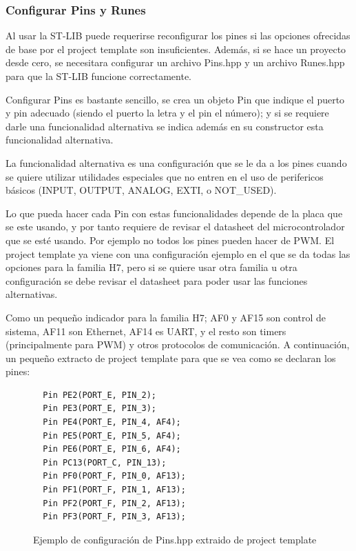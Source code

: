 \documentclass{report}
\begin{document}
\subsubsection{Configurar Pins y Runes}
Al usar la ST-LIB puede requerirse reconfigurar los pines si las opciones ofrecidas de base por el project template son insuficientes. Además, si se hace un proyecto desde cero, se necesitara configurar un archivo Pins.hpp y un archivo Runes.hpp para que la ST-LIB funcione correctamente. 
\par \vspace{0.3cm}
Configurar Pins es bastante sencillo, se crea un objeto Pin que indique el puerto y pin adecuado (siendo el puerto la letra y el pin el número); y si se requiere darle una funcionalidad alternativa se indica además en su constructor esta funcionalidad alternativa. 
\par
La funcionalidad alternativa es una configuración que se le da a los pines cuando se quiere utilizar utilidades especiales que no entren en el uso de perifericos básicos (INPUT, OUTPUT, ANALOG, EXTI, o NOT\_USED). 
\par
Lo que pueda hacer cada Pin con estas funcionalidades depende de la placa que se este usando, y por tanto requiere de revisar el datasheet del microcontrolador que se esté usando. Por ejemplo no todos los pines pueden hacer de PWM. El project template ya viene con una configuración ejemplo en el que se da todas las opciones para la familia H7, pero si se quiere usar otra familia u otra configuración se debe revisar el datasheet para poder usar las funciones alternativas. \par \vspace{0.3cm}
Como un pequeño indicador para la familia H7; AF0 y AF15 son control de sistema, AF11 son Ethernet, AF14 es UART, y el resto son timers (principalmente para PWM) y otros protocolos de comunicación. A continuación, un pequeño extracto de project template para que se vea como se declaran los pines: 
\begin{figure}[h]
\begin{lstlisting}
  Pin PE2(PORT_E, PIN_2);
  Pin PE3(PORT_E, PIN_3);
  Pin PE4(PORT_E, PIN_4, AF4);
  Pin PE5(PORT_E, PIN_5, AF4);
  Pin PE6(PORT_E, PIN_6, AF4);
  Pin PC13(PORT_C, PIN_13);
  Pin PF0(PORT_F, PIN_0, AF13);
  Pin PF1(PORT_F, PIN_1, AF13);
  Pin PF2(PORT_F, PIN_2, AF13);
  Pin PF3(PORT_F, PIN_3, AF13);
\end{lstlisting}
\caption{Ejemplo de configuración de Pins.hpp extraido de project template}
  \label{PinsConfFile}
\end{figure}
\end{document}
